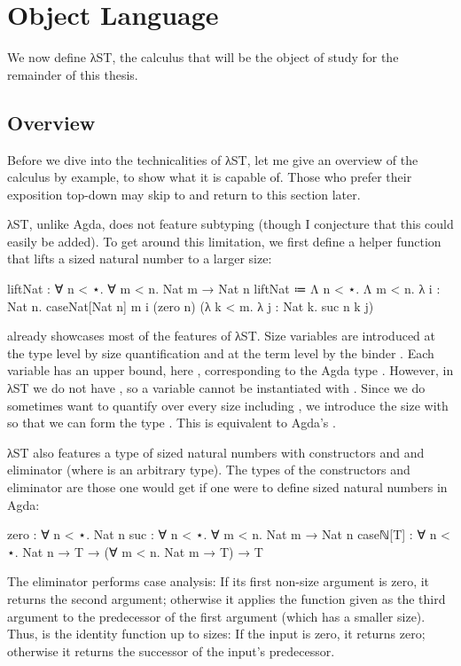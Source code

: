 \chapter{Object Language}
\label{sec:source}

We now define λST, the calculus that will be the object of study for the
remainder of this thesis.


\section{Overview}
\label{sec:source:overview}

Before we dive into the technicalities of λST, let me give an overview of the
calculus by example, to show what it is capable of. Those who prefer their
exposition top-down may skip to  and return to this section
later.

λST, unlike Agda, does not feature subtyping (though I conjecture that this
could easily be added). To get around this limitation, we first define a
helper function that lifts a sized natural number to a larger size:
\begin{code}
  liftNat : ∀ n < ⋆. ∀ m < n. Nat m → Nat n
  liftNat ≔ Λ n < ⋆. Λ m < n. λ i : Nat n.
              caseNat[Nat n] m i
                (zero n)
                (λ k < m. λ j : Nat k. suc n k j)
\end{code}

 already showcases most of the features of λST. Size variables
are introduced at the type level by size quantification  and at
the term level by the binder . Each variable has an upper bound,
here , corresponding to the Agda type . However, in λST
we do not have , so a variable  cannot be instantiated
with . Since we do sometimes want to quantify over every size including
, we introduce the size  with  so that we can
form the type . This is equivalent to Agda's
.

λST also features a type of sized natural numbers  with
constructors  and  and eliminator 
(where  is an arbitrary type). The types of the constructors and
eliminator are those one would get if one were to define sized natural numbers
in Agda:
\begin{code}
  zero     : ∀ n < ⋆. Nat n
  suc      : ∀ n < ⋆. ∀ m < n. Nat m → Nat n
  caseℕ[T] : ∀ n < ⋆. Nat n → T → (∀ m < n. Nat m → T) → T
\end{code}
The  eliminator performs case analysis: If its first non-size
argument is zero, it returns the second argument; otherwise it applies the
function given as the third argument to the predecessor of the first argument
(which has a smaller size). Thus,  is the identity function up to
sizes: If the input is zero, it returns zero; otherwise it returns the successor
of the input's predecessor.

